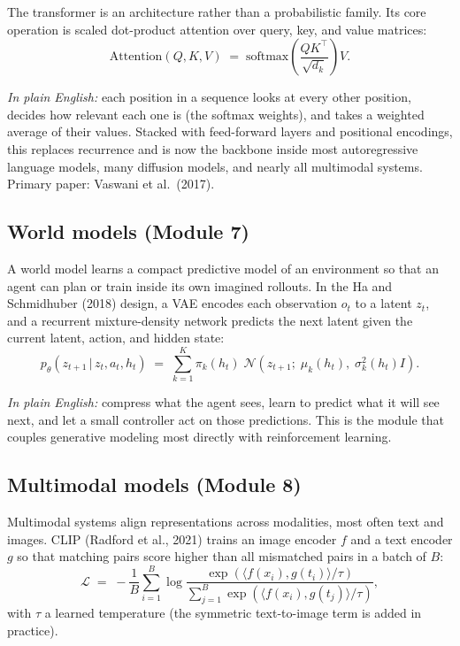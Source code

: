 \documentclass[11pt]{article}
\newcommand{\given}{\,\vert\,}
\theoremstyle{remark}
\begin{document}
The transformer is an architecture rather than a probabilistic family. Its core operation is scaled dot-product attention over query, key, and value matrices:
\begin{equation}
\mathrm{Attention}(Q, K, V) \;=\; \mathrm{softmax}\!\left(\frac{Q K^{\top}}{\sqrt{d_k}}\right) V .
\end{equation}

\noindent\textit{In plain English:} each position in a sequence looks at every other position, decides how relevant each one is (the softmax weights), and takes a weighted average of their values. Stacked with feed-forward layers and positional encodings, this replaces recurrence and is now the backbone inside most autoregressive language models, many diffusion models, and nearly all multimodal systems. Primary paper: Vaswani et al.\ (2017).

\subsection{World models (Module 7)}

A world model learns a compact predictive model of an environment so that an agent can plan or train inside its own imagined rollouts. In the Ha and Schmidhuber (2018) design, a VAE encodes each observation $o_t$ to a latent $z_t$, and a recurrent mixture-density network predicts the next latent given the current latent, action, and hidden state:
\begin{equation}
p_\theta(z_{t+1} \given z_t, a_t, h_t) \;=\; \sum_{k=1}^{K} \pi_k(h_t)\; \mathcal{N}\!\left(z_{t+1};\; \mu_k(h_t),\; \sigma_k^2(h_t) I\right).
\end{equation}

\noindent\textit{In plain English:} compress what the agent sees, learn to predict what it will see next, and let a small controller act on those predictions. This is the module that couples generative modeling most directly with reinforcement learning.

\subsection{Multimodal models (Module 8)}

Multimodal systems align representations across modalities, most often text and images. CLIP (Radford et al., 2021) trains an image encoder $f$ and a text encoder $g$ so that matching pairs score higher than all mismatched pairs in a batch of $B$:
\begin{equation}
\mathcal{L} \;=\; -\frac{1}{B}\sum_{i=1}^{B} \log \frac{\exp\!\left(\langle f(x_i), g(t_i)\rangle / \tau\right)}{\sum_{j=1}^{B} \exp\!\left(\langle f(x_i), g(t_j)\rangle / \tau\right)} ,
\end{equation}
with $\tau$ a learned temperature (the symmetric text-to-image term is added in practice).
\end{document}
